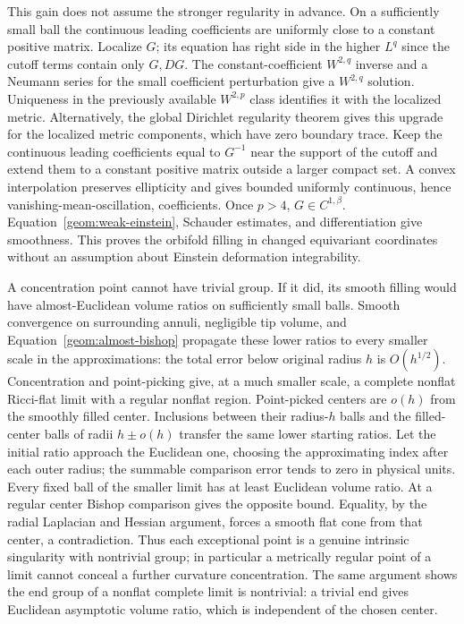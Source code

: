 This gain does not assume the stronger regularity in advance.
On a sufficiently small ball the continuous leading coefficients
are uniformly close to a constant positive matrix. Localize $G$;
its equation has right side in the higher $L^q$ since the cutoff
terms contain only $G,DG$. The constant-coefficient $W^{2,q}$
inverse and a Neumann series for the small coefficient perturbation
give a $W^{2,q}$ solution. Uniqueness in the previously available
$W^{2,p}$ class identifies it with the localized metric.
Alternatively, the global Dirichlet regularity theorem
\cite[Theorem~4.2]{ChiarenzaFrascaLongo1993} gives this upgrade for the
localized metric components, which have zero boundary trace.
Keep the continuous leading coefficients equal to $G^{-1}$ near the
support of the cutoff and extend them to a constant positive matrix
outside a larger compact set. A convex interpolation
preserves ellipticity and gives bounded uniformly continuous, hence
vanishing-mean-oscillation, coefficients.
Once $p>4$, $G\in C^{1,\beta}$.
Equation~\eqref{geom:weak-einstein}, Schauder estimates, and
differentiation give smoothness. This proves the orbifold filling
in changed equivariant coordinates without an assumption about
Einstein deformation integrability.

A concentration point cannot have trivial group. If it did, its
smooth filling would have almost-Euclidean volume ratios on sufficiently
small balls. Smooth convergence on surrounding annuli, negligible
tip volume, and Equation~\eqref{geom:almost-bishop} propagate these
lower ratios to every smaller scale in the approximations: the total
error below original radius $h$ is $O(h^{1/2})$. Concentration and
point-picking give, at a much smaller scale, a complete nonflat
Ricci-flat limit with a regular nonflat region. Point-picked centers
are $o(h)$ from the smoothly filled center. Inclusions between their
radius-$h$ balls and the filled-center balls of radii $h\pm o(h)$
transfer the same lower starting ratios. Let the initial ratio approach
the Euclidean one, choosing the approximating index after each outer
radius; the summable comparison error tends to zero in physical units.
Every fixed ball of the smaller limit has at least
Euclidean volume ratio. At a regular center Bishop comparison gives
the opposite bound. Equality, by the radial Laplacian and Hessian
argument, forces a smooth flat cone from that center, a contradiction.
Thus each exceptional point is a genuine intrinsic singularity with
nontrivial group; in particular a metrically regular point of a limit
cannot conceal a further curvature concentration. The same argument
shows the end group of a nonflat complete limit is nontrivial: a trivial end gives Euclidean
asymptotic volume ratio, which is independent of the chosen center.

